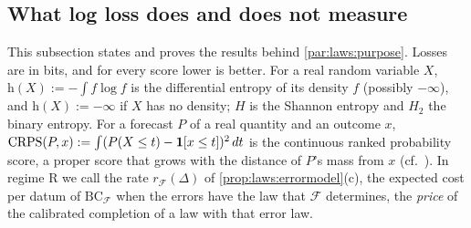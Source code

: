 \subsection{What log loss does and does not measure}\label{app:laws:purpose}

This subsection states and proves the results behind \cref{par:laws:purpose}. Losses are in bits, and for every score lower is better. For a real random variable $X$, $\mathrm h(X):=-\int f\log f$ is the differential entropy of its density $f$ (possibly $-\infty$), and $\mathrm h(X):=-\infty$ if $X$ has no density; $H$ is the Shannon entropy and $H_2$ the binary entropy. For a forecast $P$ of a real quantity and an outcome $x$, $\mathrm{CRPS}(P,x):=\int(P(X\le t)-\mathbf{1}[x\le t])^2\,dt$ is the continuous ranked probability score, a proper score that grows with the distance of $P$'s mass from $x$ (cf.\ \citealp{gneiting2007strictly}). In regime R we call the rate $r_{\mathcal F}(\Delta)$ of \cref{prop:laws:errormodel}(c), the expected cost per datum of $\mathrm{BC}_{\mathcal F}$ when the errors have the law that $\mathcal F$ determines, the \emph{price} of the calibrated completion of a law with that error law.

